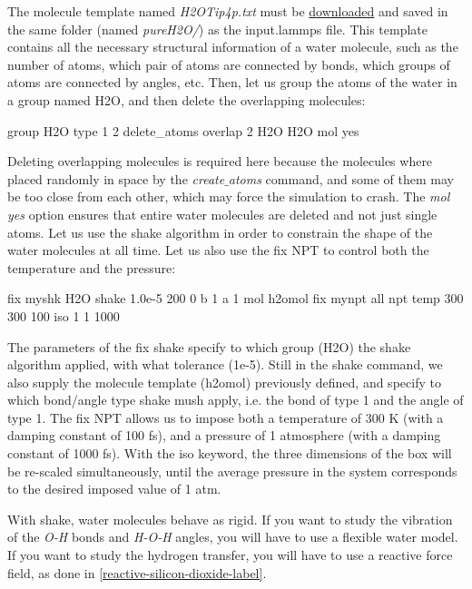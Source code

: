 \noindent The molecule template named \textit{H2OTip4p.txt} must be \href{../../../../../inputs/level2/polymer-in-water/pureH2O/H2OTip4p.txt}{downloaded}
and saved in the same folder (named \textit{pureH2O/}) as the
input.lammps file. This template contains all the necessary structural
information of a water molecule, such as the number of atoms, 
which pair of atoms are connected by bonds, which
groups of atoms are connected by angles, etc.
Then, let us group the atoms of the water in a group named
H2O, and then delete the overlapping molecules:

\begin{lcverbatim}
group H2O type 1 2
delete_atoms overlap 2 H2O H2O mol yes
\end{lcverbatim}

\noindent Deleting overlapping molecules is required here
because the molecules where placed randomly in space by
the \textit{create$\_$atoms} command, and some of them may be too
close from each other, which may force the simulation to
crash.
The \textit{mol yes} option ensures that entire water molecules are deleted and not just single atoms.
Let us use the shake algorithm in order to constrain the
shape of the water molecules at all time. Let us also use the fix NPT to
control both the temperature and the pressure:

\begin{lcverbatim}
fix myshk H2O shake 1.0e-5 200 0 b 1 a 1 mol h2omol
fix mynpt all npt temp 300 300 100 iso 1 1 1000
\end{lcverbatim}

\noindent The parameters of the fix shake specify to
which group (H2O) the shake algorithm applied, with what
tolerance (1e-5). Still in the shake command, we also supply
the molecule template (h2omol) previously defined, and
specify to which bond/angle type shake mush apply, i.e. the
bond of type 1 and the angle of type 1.
The fix NPT allows us to impose both a temperature of 300 K (with a damping constant of 100 fs),
and a pressure of 1 atmosphere (with a damping constant of 1000 fs). With the iso keyword, the
three dimensions of the box will be re-scaled simultaneously, until the average pressure in the system 
corresponds to the desired imposed value of 1 atm.

\begin{tcolorbox}[colback=mylightblue!5!white,colframe=mylightblue!75!black,title=About rigid water model]
With shake, water molecules behave as rigid. If
you want to study the vibration of the \textit{O-H} bonds and
\textit{H-O-H} angles, you will have to use a flexible water
model. If you want to study the hydrogen transfer, you
will have to use a reactive force field,
as done in \ref{reactive-silicon-dioxide-label}.
\end{tcolorbox}

